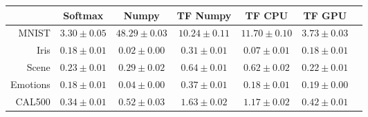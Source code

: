 \begin{tabular}{r|cccccc}
& Softmax & Numpy & TF Numpy & TF CPU & TF GPU \\
\hline
MNIST & $3.30 \pm 0.05$ & $48.29 \pm 0.03$ & $10.24 \pm 0.11$ & $11.70 \pm 0.10$ & $3.73 \pm 0.03$ \\
Iris & $0.18 \pm 0.01$ & $0.02 \pm 0.00$ & $0.31 \pm 0.01$ & $0.07 \pm 0.01$ & $0.18 \pm 0.01$ \\
Scene & $0.23 \pm 0.01$ & $0.29 \pm 0.02$ & $0.64 \pm 0.01$ & $0.62 \pm 0.02$ & $0.22 \pm 0.01$ \\
Emotions & $0.18 \pm 0.01$ & $0.04 \pm 0.00$ & $0.37 \pm 0.01$ & $0.18 \pm 0.01$ & $0.19 \pm 0.00$ \\
CAL500 & $0.34 \pm 0.01$ & $0.52 \pm 0.03$ & $1.63 \pm 0.02$ & $1.17 \pm 0.02$ & $0.42 \pm 0.01$ \\
\end{tabular}
